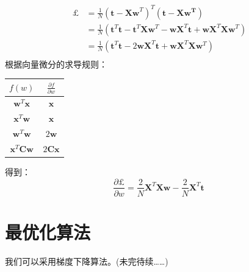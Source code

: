 \documentclass[a4paper, 11pt, hyperref, UTF8]{ctexart} %
\begin{document}
\begin{align*}
\ \pounds &= \frac{1}{N}(\bm{t}-\bm{Xw}^T)^T(\bm{t}-\bm{Xw^T}) \\
          &= \frac{1}{N}(\bm{t}^T\bm{t} - \bm{t}^T\bm{X}\bm{w}^T - \bm{w}\bm{X}^T\bm{t}+\bm{w}\bm{X}^T\bm{X}\bm{w}^T) \\
          &= \frac{1}{N}(\bm{t}^T\bm{t} - 2\bm{w}\bm{X}^T\bm{t}+\bm{w}\bm{X}^T\bm{X}\bm{w}^T) \\
\end{align*}
根据向量微分的求导规则：
\begin{center}
\begin{tabular}{c|c}
\hline
$f(w)$                 & $\frac{\partial{f}}{\partial{w}}$   \\
\hline
$\bm{w}^T\bm{x}$       & $\bm{x}$                            \\
$\bm{x}^T\bm{w}$       & $\bm{x}$                            \\
$\bm{w}^T\bm{w}$       & $2\bm{w}$                           \\
$\bm{x}^T\bm{C}\bm{w}$ & $2\bm{Cx}$                          \\
\hline
\end{tabular}
\end{center}
得到：
$$ \frac{\partial{\pounds}}{\partial{w}} = \frac{2}{N}\bm{X}^T\bm{Xw}-\frac{2}{N}\bm{X}^T\bm{t} $$

\section{最优化算法}

我们可以采用梯度下降算法。(未完待续……)






\end{document}
